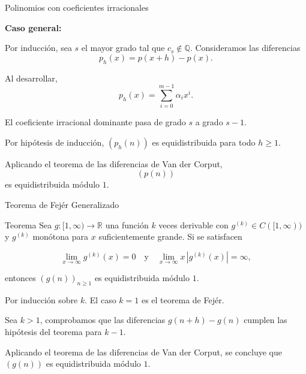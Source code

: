 \begin{frame}{Polinomios con coeficientes irracionales}

\textbf{Caso general:}

\vspace{0.2cm}

Por inducción, sea $s$ el mayor grado tal que $c_s\notin\mathbb Q$.
Consideramos las diferencias
\[
p_h(x)=p(x+h)-p(x).
\]

\vspace{0.1cm}
\pause

Al desarrollar,
\[
p_h(x)
=
\sum_{i=0}^{m-1}\alpha_i x^i.
\]

El coeficiente irracional dominante pasa de grado
$s$ a grado $s-1$.

\vspace{0.1cm}

Por hipótesis de inducción, $(p_h(n))$ es equidistribuida 
para todo $h\ge 1$.

\vspace{0.1cm}
\pause

Aplicando el teorema de las diferencias de
Van der Corput,
\[
(p(n))
\]
es equidistribuida módulo $1$.

\end{frame}

\begin{frame}{Teorema de Fejér Generalizado}
\begin{block}{Teorema}
Sea $g:[1,\infty)\to\mathbb R$ una función $k$ veces derivable con
$g^{(k)}\in C([1,\infty))$ y $g^{(k)}$ monótona para $x$ 
suficientemente grande. Si se satisfacen

\[
\lim_{x\to\infty}g^{(k)}(x)=0
\quad \text{y} \quad
\lim_{x\to\infty}x\,|g^{(k)}(x)|=\infty,
\]

entonces $(g(n))_{n\geq1}$ es equidistribuida módulo $1$.
\end{block}

\vspace{0.2cm}
\pause 

\begin{demostracion}
Por inducción sobre $k$. El caso $k=1$ es el teorema de Fejér.

\vspace{0.15cm}

Sea $k>1$, comprobamos que las diferencias $g(n+h)-g(n)$ cumplen
las hipótesis del teorema para $k-1$. 

\vspace{0.15cm}

Aplicando el teorema de las diferencias de Van der Corput, 
se concluye que $(g(n))$ es equidistribuida módulo $1$.
\end{demostracion}

\end{frame}

